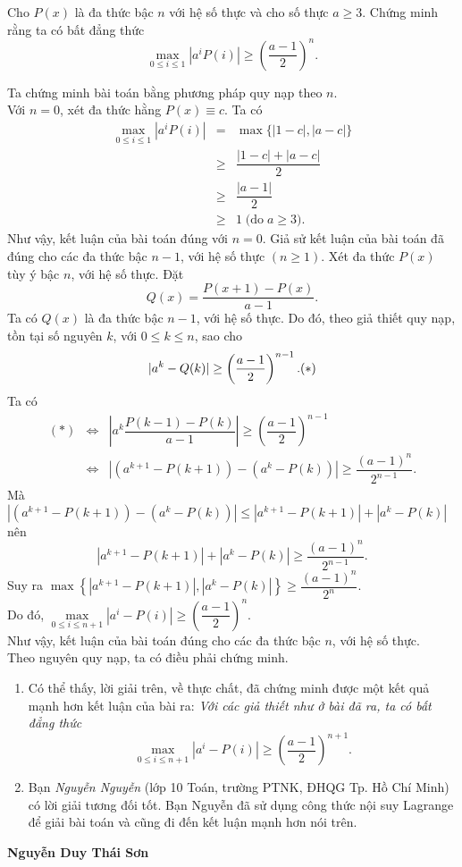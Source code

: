 \begin{bt}%
Cho $P(x)$ là đa thức bậc $n$ với hệ số thực và cho số thực $a \ge 3$. Chứng minh rằng ta có bất đẳng thức
$$ \max_{0 \le i \le 1}|a^iP(i)|  \ge \left(\dfrac{a-1}{2}\right)^n.$$
\loigiai
{Ta chứng minh bài toán bằng phương pháp quy nạp theo $n$.\\
Với $n=0$, xét đa thức hằng $P(x) \equiv c$. Ta có
{\allowdisplaybreaks
\begin{eqnarray*}
\max_{0 \le i \le 1}|a^iP(i)| &=&\max\{|1-c|,|a-c|\}\\ 
 &\ge&\dfrac{|1-c|+|a-c|}{2}\\
 &\ge&\dfrac{|a-1|}{2}\\
 &\ge&1 \;\text{(do} \; a\ge 3).
\end{eqnarray*}}Như vậy, kết luận của bài toán đúng với $n=0$.
Giả sử kết luận của bài toán đã đúng cho các đa thức bậc $n-1$, với hệ số thực $(n \ge 1)$.
Xét đa thức $P(x)$ tùy ý bậc $n$, với hệ số thực.
Đặt 
$$Q(x)=\dfrac{P(x+1)-P(x)}{a-1}.$$
Ta có $Q(x)$ là đa thức bậc $n-1$, với hệ số thực. Do đó, theo giả thiết quy nạp, tồn tại số nguyên $k$, với $0 \le k \le n$, sao cho
$$ |a^k-Q(k)| \ge \left(\dfrac{a-1}{2}\right)^{n-1}. \hfill (*)$$
Ta có
{\allowdisplaybreaks
\begin{eqnarray*}
(*)& \Leftrightarrow &\left|a^k\dfrac{P(k-1)-P(k)}{a-1}\right| \ge \left(\dfrac{a-1}{2}\right)^{n-1}\\ 
& \Leftrightarrow &|(a^{k+1}-P(k+1))-(a^k-P(k))|
\ge \dfrac{(a-1)^n}{2^{n-1}}.
\end{eqnarray*}}
Mà $|(a^{k+1}-P(k+1))-(a^k-P(k))| \le |a^{k+1}-P(k+1)|+|a^k-P(k)|$ nên 
$$|a^{k+1}-P(k+1)|+|a^k-P(k)| \ge \dfrac{(a-1)^n}{2^{n-1}}.$$
Suy ra $\max\left\{|a^{k+1}-P(k+1)|,|a^k-P(k)|\right\} \ge \dfrac{(a-1)^n}{2^n}$.\\
Do đó, $\max\limits_{0 \le i \le n+1}|a^i-P(i)| \ge \left(\dfrac{a-1}{2}\right)^n$.\\
Như vậy, kết luận của bài toán đúng cho các đa thức bậc $n$, với hệ số thực.\\
Theo nguyên quy nạp, ta có điều phải chứng minh. 
\begin{nx}\hfill
\begin{enumerate}
\item Có thể thấy, lời giải trên, về thực chất, đã chứng minh được một kết quả mạnh hơn kết luận của bài ra: \textit{Với các giả thiết như ở bài đã ra, ta có bất đẳng thức}
$$\max_{0 \le i \le n+1}|a^i-P(i)| \ge \left(\dfrac{a-1}{2}\right)^{n+1}.$$
\item Bạn \textit{Nguyễn Nguyễn} (lớp 10 Toán, trường PTNK, ĐHQG Tp. Hồ Chí Minh) có lời giải tương đối tốt. Bạn Nguyễn đã sử dụng công thức nội suy Lagrange để giải bài toán và cũng đi đến kết luận mạnh hơn nói trên.
\end{enumerate}
\end{nx}
\begin{flushright}
\textbf{Nguyễn Duy Thái Sơn}
\end{flushright}
}
\end{bt}


